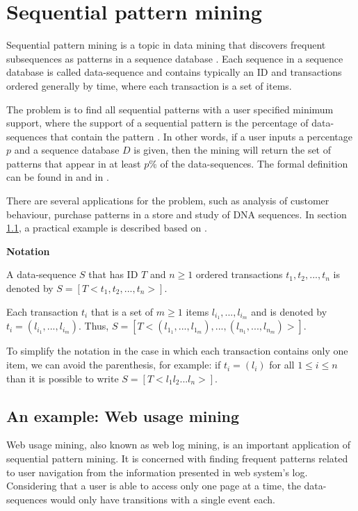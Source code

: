 \section{Sequential pattern mining}
\label{sec-seqmining}

Sequential pattern mining is a topic in data mining that discovers frequent subsequences as patterns in a sequence
database \cite{Nizar}. Each sequence in a sequence database is called data-sequence and contains typically an ID and transactions ordered generally by time, where each transaction is a set of items.

The problem is to find all sequential patterns with a user specified minimum support, where the support of a sequential pattern is the percentage of data-sequences that contain the pattern \cite{Rakesh}. In other words, if a user inputs a percentage $p$ and a sequence database $D$ is given, then the mining will return the set of patterns that appear in at least $p\%$ of the data-sequences. The formal definition can be found in \cite{Nizar} and in \cite{Pei}.

There are several applications for the problem, such as analysis of customer behaviour, purchase patterns in a store and study of DNA sequences. In section \ref{webusage}, a practical example is described based on \cite{Nizar}.

\textbf{Notation}

A data-sequence $S$ that has ID $T$ and $n \geq 1$ ordered transactions $t_1,t_2,...,t_n$ is denoted by $S = [T <t_1,t_2,...,t_n>]$. 

Each transaction $t_i$ that is a set of $m \geq 1$ items $l_{i_1},...,l_{i_m}$ and is denoted by $t_i = (l_{i_1},...,l_{i_m})$. Thus, $S = [T <(l_{1_1},...,l_{1_m}), ... ,(l_{n_1},...,l_{n_m})>]$. 

To simplify the notation in the case in which each transaction contains only one item, we can avoid the parenthesis, for example: if $t_i = (l_i)$ for all $ 1 \leq i \leq n$ than it is possible to write $S = [T <l_1l_2...l_n>]$.


\subsection{An example: Web usage mining}
\label{webusage}

Web usage mining, also known as web log mining, is an important application of sequential pattern mining. It is concerned with finding frequent patterns related to user navigation from the information presented in web system's log. Considering that a user is able to access only one page at a time, the data-sequences would only have transitions with a single event each.

